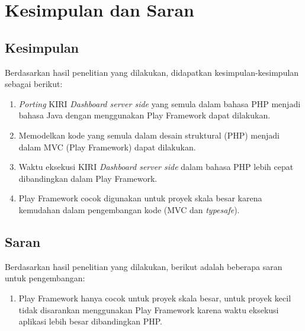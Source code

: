 \chapter{Kesimpulan dan Saran}
\label{chap:kesimpulansaran}

\section{Kesimpulan}
\label{sec:kesimpulan}
Berdasarkan hasil penelitian yang dilakukan, didapatkan kesimpulan-kesimpulan sebagai berikut:
\begin{enumerate}
	\item \textit{Porting} KIRI \textit{Dashboard server side} yang semula dalam bahasa PHP menjadi bahasa Java dengan menggunakan Play Framework dapat dilakukan.
	\item Memodelkan kode yang semula dalam desain struktural (PHP) menjadi dalam MVC (Play Framework) dapat dilakukan.
	\item Waktu eksekusi KIRI \textit{Dashboard server side} dalam bahasa PHP lebih cepat dibandingkan dalam Play Framework.
	\item Play Framework cocok digunakan untuk proyek skala besar karena kemudahan dalam pengembangan kode (MVC dan \textit{typesafe}).
\end{enumerate}

\section{Saran}
\label{sec:saran}
Berdasarkan hasil penelitian yang dilakukan, berikut adalah beberapa saran untuk pengembangan:
\begin{enumerate}
	\item Play Framework hanya cocok untuk proyek skala besar, untuk proyek kecil tidak disarankan menggunakan Play Framework karena waktu eksekusi aplikasi lebih besar dibandingkan PHP.
\end{enumerate}